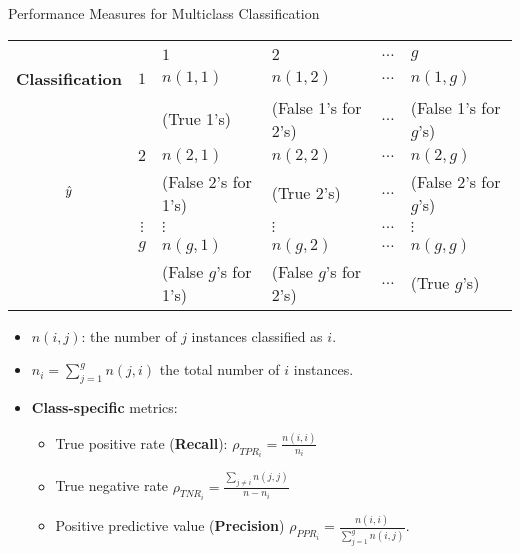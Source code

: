 \documentclass[11pt,compress,t,notes=noshow, xcolor=table]{beamer}
\begin{document}
\begin{vbframe}{Performance Measures for Multiclass Classification}
	\footnotesize{
		\begin{center}
			\tiny
			\begin{tabular}{cc|>{\centering\arraybackslash}p{8em}>{\centering\arraybackslash}p{8em}>{\centering\arraybackslash}p{5em}>{\centering\arraybackslash}p{8em}}
				& & \multicolumn{4}{c}{\bfseries True Class $y$} \\
				& & $1$ & $2$ & $\ldots$ & $g$  \\
				\hline
				\bfseries Classification     & $1$ & $n(1,1)$  &  $n(1,2)$  & $\ldots$ &  $n(1,g)$ \\
				& & (True 1's) & (False 1's for 2's) & $\ldots$ &  (False 1's for $g$'s)  \\
				& $2$ &  $n(2,1)$  &  $n(2,2)$  & $\ldots$ & $n(2,g)$  \\
				$\hat{y}$ & & (False 2's for 1's) & (True 2's) & $\ldots$ &  (False 2's for $g$'s)  \\
				& $\vdots$ & $\vdots$ & $\vdots$ & $\ldots$ & $\vdots$ \\
				& $g$ & $n(g,1)$ & $n(g,2)$  & $\ldots$ &  $n(g,g)$\\
				& & (False $g$'s for 1's) & (False $g$'s for 2's) & $\ldots$ &  (True $g$'s)  \\
			\end{tabular}
		\end{center}
		
		\begin{itemize}
			\item $n(i,j)$: the number of $j$ instances classified as $i$.
            \vspace{5pt}

            \item $n_i = \sum_{j=1}^g n(j,i)$ the total number of $i$ instances.
            \vspace{5pt}

            \item \textbf{Class-specific} metrics:
            \begin{itemize}
                \footnotesize 
                
                \item True positive rate (\textbf{Recall}): $\rho_{TPR_i} = \frac{n(i,i)}{n_i}$
                \vspace{5pt}

                \item True negative rate $\rho_{TNR_i} = \frac{\sum_{j\neq i}n(j,j)}{n-n_i}$ 
                \vspace{5pt}

                \item Positive predictive value (\textbf{Precision}) $\rho_{PPR_i} = \frac{n(i,i)}{\sum_{j=1}^g n(i,j)}$.
                
            \end{itemize}

		\end{itemize}
	}
\end{vbframe}
\end{document}
